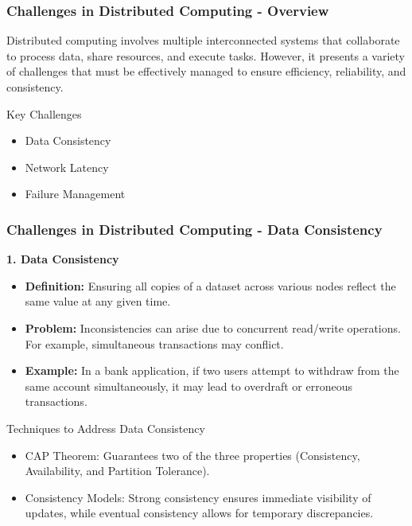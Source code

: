 \documentclass[aspectratio=169]{beamer}
\begin{document}
\begin{frame}[fragile]
    \frametitle{Challenges in Distributed Computing - Overview}

    Distributed computing involves multiple interconnected systems that collaborate to process data, share resources, and execute tasks. However, it presents a variety of challenges that must be effectively managed to ensure efficiency, reliability, and consistency.

    \begin{block}{Key Challenges}
        \begin{itemize}
            \item Data Consistency
            \item Network Latency
            \item Failure Management
        \end{itemize}
    \end{block}
\end{frame}

\begin{frame}[fragile]
    \frametitle{Challenges in Distributed Computing - Data Consistency}

    \textbf{1. Data Consistency}

    \begin{itemize}
        \item \textbf{Definition:} Ensuring all copies of a dataset across various nodes reflect the same value at any given time.
        
        \item \textbf{Problem:} Inconsistencies can arise due to concurrent read/write operations. For example, simultaneous transactions may conflict.
        
        \item \textbf{Example:} In a bank application, if two users attempt to withdraw from the same account simultaneously, it may lead to overdraft or erroneous transactions.
    \end{itemize}

    \begin{block}{Techniques to Address Data Consistency}
        \begin{itemize}
            \item CAP Theorem: Guarantees two of the three properties (Consistency, Availability, and Partition Tolerance).
            \item Consistency Models: Strong consistency ensures immediate visibility of updates, while eventual consistency allows for temporary discrepancies.
        \end{itemize}
    \end{block}
\end{frame}
\end{document}

